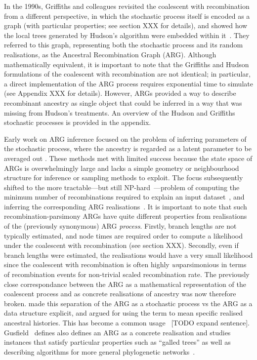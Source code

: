 \documentclass{article}
\begin{document}
In the 1990s, Griffiths and colleagues revisited the
coalescent with recombination from a different perspective,
in which the stochastic process itself is encoded as a graph
(with particular properties; see section XXX for details),
and showed how the local trees generated by Hudson's algorithm
were embedded within
it~\citep{griffiths1991two,ethier1990two,griffiths1996ancestral,griffiths1997ancestral}.
They referred to this graph,
representing both the stochastic process and
its random realisations, as the Ancestral Recombination Graph (ARG).
Although mathematically equivalent, it is
important to note that the Griffiths and Hudson formulations of
the coalescent with recombination are not identical;
in particular, a direct implementation of the ARG process
requires exponential time to simulate
(see Appendix XXX for details). However, ARGs provided a way
to describe recombinant ancestry as single object that
could be inferred in a way
that was missing from Hudson's treatments.
An overview of the Hudson and Griffiths stochastic processes is provided in the appendix.

Early work on ARG inference focused on the problem of
inferring parameters of the
stochastic process, where the ancestry is regarded as a
latent parameter to be averaged out
\citep[e.g.][]{griffiths1996ancestral,kuhner2000maximum, nielsen2000estimation,
fearnhead2001estimating}.
These methods met with limited success
because the state space of ARGs is overwhelmingly large and
lacks a simple geometry or neighbourhood structure for inference or
sampling methods to  exploit.
The focus subsequently shifted to the more
tractable---but still NP-hard~\citep{wang2001perfect}---problem of computing
the minimum number of recombinations required
to explain an input dataset~\citep{myers2003bounds}, and inferring the corresponding
ARG realisations~\citep{song2003parsimonious,song2005efficient,lyngso2005minimum}.
It is important to note that such recombination-parsimony ARGs
have quite different properties from realisations of the
(previously synonymous) ARG \emph{process}. Firstly, branch lengths are
not typically estimated, and node times are required
order to compute a likelihood under the coalescent with recombination
(see section XXX). Secondly, even if branch lengths were estimated,
the realisations would have a very small likelihood since
the coalescent with recombination is often highly \emph{un}parsimonious
in terms of recombination events for non-trivial scaled recombination rate.
The previously close correspondance
between the ARG as a mathematical representation of the coalescent process
and as concrete realisations of ancestry was now therefore broken.
\cite{minichiello2006mapping} made this separation of the ARG as a
stochastic process vs the ARG as a data structure explicit, and
argued for using the term to mean specific realised ancestral histories.
This has become a common
usage~\citep{mathieson2020ancestry,brandt2021evaluation}
[TODO expand sentence].
Gusfield~\citep{gusfield2014recombinatorics}
defines also defines an ARG as a concrete realisation
and studies instances that satisfy particular
properties such as ``galled trees''
\citep{wang2001perfect, gusfield2004optimal}
as well as describing algorithms for more general phylogenetic
networks~\citep{huson2010phylogenetic}.
\end{document}
